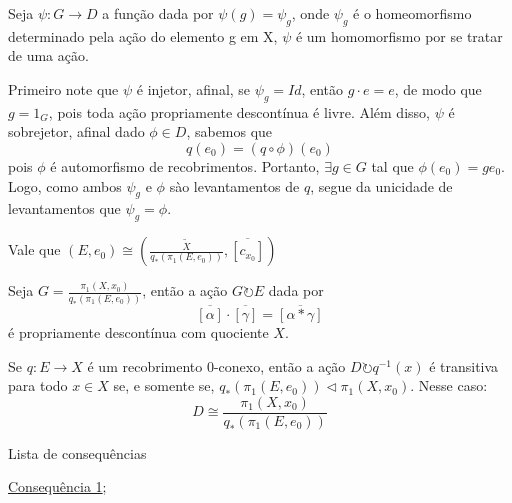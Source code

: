 \begin{dem}
    Seja $\psi:G \longrightarrow D$ a função dada por $\psi(g) = \psi_g$, onde $\psi_g$ é o homeomorfismo determinado pela ação do elemento g em X, $\psi$ é um homomorfismo por se tratar de uma ação.

    Primeiro note que $\psi$ é injetor, afinal, se $\psi_g = Id$, então $g \cdot e = e$, de modo que $g = 1_G$, pois toda ação propriamente descontínua é livre. Além disso, $\psi$ é sobrejetor, afinal dado $\phi \in D$, sabemos que $$q(e_0) = (q \circ \phi)(e_0)$$ pois $\phi$ é automorfismo de recobrimentos. Portanto, $\exists g \in G$ tal que $\phi(e_0) = ge_0$. Logo, como ambos $\psi_g$ e $\phi$ sào levantamentos de $q$, segue da unicidade de levantamentos que $\psi_g = \phi$.
\end{dem}

\begin{af}
    Vale que $(E, e_0) \cong (\frac{\tilde X}{q_*(\pi_1(E, e_0))}, \overline{[c_{x_0}]})$
\end{af}

\begin{af}
    Seja $G = \frac{\pi_1(X, x_0)}{q_*(\pi_1(E, e_0))}$, então a ação $G \circlearrowright E$ dada por $$\overline{[\alpha]} \cdot \overline{[\gamma]} = \overline{[\alpha * \gamma]}$$ é propriamente descontínua com quociente $X$.
\end{af}

\begin{thm}
	Se $q:E \longrightarrow X$ é um recobrimento $0$-conexo, então a ação $D \circlearrowright q^{-1}(x)$ é transitiva para todo $x \in X$ se, e somente se, $q_*(\pi_1(E, e_0)) \triangleleft \pi_1(X, x_0)$. Nesse caso: $$D \cong \frac{\pi_1(X, x_0)}{q_*(\pi_1(E, e_0))}$$
\end{thm}

\begin{titlemize}{Lista de consequências}
	\item \hyperref[consequencia1]{Consequência 1};\\ %
	\item \hyperref[]{}
\end{titlemize}
